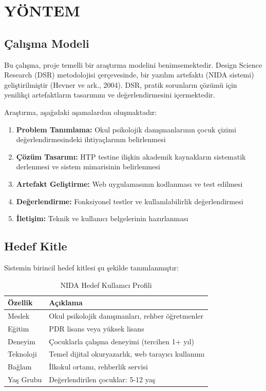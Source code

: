 
\chapter{YÖNTEM}

\section{Çalışma Modeli}

Bu çalışma, proje temelli bir araştırma modelini benimsemektedir. Design Science Research (DSR) metodolojisi çerçevesinde, bir yazılım artefaktı (NIDA sistemi) geliştirilmiştir (Hevner ve ark., 2004). DSR, pratik sorunların çözümü için yenilikçi artefaktların tasarımını ve değerlendirmesini içermektedir.

Araştırma, aşağıdaki aşamalardan oluşmaktadır:

\begin{enumerate}
  \item \textbf{Problem Tanımlama:} Okul psikolojik danışmanlarının çocuk çizimi değerlendirmesindeki ihtiyaçlarının belirlenmesi
  \item \textbf{Çözüm Tasarımı:} HTP testine ilişkin akademik kaynakların sistematik derlenmesi ve sistem mimarisinin belirlenmesi
  \item \textbf{Artefakt Geliştirme:} Web uygulamasının kodlanması ve test edilmesi
  \item \textbf{Değerlendirme:} Fonksiyonel testler ve kullanılabilirlik değerlendirmesi
  \item \textbf{İletişim:} Teknik ve kullanıcı belgelerinin hazırlanması
\end{enumerate}

\section{Hedef Kitle}

Sistemin birincil hedef kitlesi şu şekilde tanımlanmıştır:

\begin{table}[H]
\centering
\caption{NIDA Hedef Kullanıcı Profili}
\label{tab:hedefkitle}
\begin{tabular}{p{4cm}p{9cm}}
\toprule
\textbf{Özellik} & \textbf{Açıklama} \\
\midrule
Meslek & Okul psikolojik danışmanları, rehber öğretmenler \\
Eğitim & PDR lisans veya yüksek lisans \\
Deneyim & Çocuklarla çalışma deneyimi (tercihen 1+ yıl) \\
Teknoloji & Temel dijital okuryazarlık, web tarayıcı kullanımı \\
Bağlam & İlkokul ortamı, rehberlik servisi \\
Yaş Grubu & Değerlendirilen çocuklar: 5-12 yaş \\
\bottomrule
\end{tabular}
\end{table}

